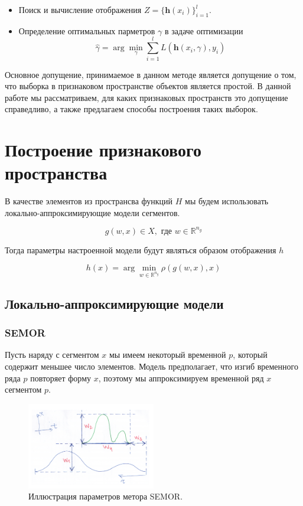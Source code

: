 \documentclass[12pt, fleqn, unicode]{article}
\newcommand{\bh}{\mathbf{h}}
\newcommand{\R}{\mathbb{R}}
\begin{document}
\begin{itemize}
    \item Поиск и вычисление отображения $Z = \{\bh(x_i)\}_{i=1}^l$.
    \item Определение оптимальных парметров $\gamma$ в задаче оптимизации
    $$
    \hat{\gamma} = \arg\min_{\gamma} \sum_{i=1}^{l}L(\bh(x_i, \gamma), y_i)
    $$
\end{itemize}

Основное допущение, принимаемое в данном методе является допущение о том, что
выборка в признаковом пространстве объектов является простой. В данной работе
мы рассматриваем, для каких признаковых пространств это допущение справедливо,
а также предлагаем способы построения таких выборок.

\section{Построение признакового пространства}

В качестве элементов из пространсва функций $H$ мы будем использовать
локально-аппроксимирующие модели сегментов.

$$
g(w, x) \in X, \text{ где }w \in \R^{n_g}
$$

Тогда параметры настроенной модели будут являться образом отображения $h$

$$
h(x) = \arg\min_{w \in \R^{n_g}} \rho(g(w, x), x)
$$

\subsection{Локально-аппроксимирующие модели}

\subsubsection{SEMOR}

Пусть наряду с сегментом $x$ мы имеем некоторый временной $p$, который содержит
меньшее число элементов. Модель предполагает, что изгиб временного ряда $p$ повторяет
форму $x$, поэтому мы аппроксимируем временной ряд $x$ сегментом $p$.

\begin{figure}[ht]
    \caption{Иллюстрация параметров метора SEMOR.}
    \centering
      \includegraphics[width=0.5\textwidth]{../pics/semor_illustration.png}
\end{figure}
\end{document}
